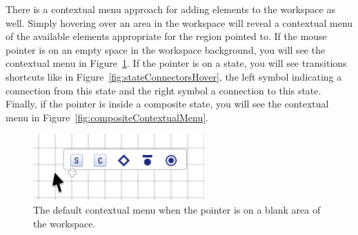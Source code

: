 \documentclass[11pt]{amsart}
\begin{document}
There is a contextual menu approach for adding elements to the workspace as well. Simply hovering over an area in the workspace will reveal a contextual menu of the available elements appropriate for the region pointed to. If the mouse pointer is on an empty space in the workspace background, you will see the contextual menu in Figure~\ref{fig:defaultContextualMenu}. If the pointer is on a state, you will see transitions shortcuts like in Figure~\ref{fig:stateConnectorsHover}, the left symbol indicating a connection from this state and the right symbol a connection to this state. Finally, if the pointer is inside a composite state, you will see the contextual menu in Figure~\ref{fig:compositeContextualMenu}.


\begin{figure}

\begin{center}
\vspace{.2in}
\centerline {
\includegraphics[height=1in]{StatechartsImages/DefaultContextualMenu.png}
}
\caption{The default contextual menu when the pointer is on a blank area of the workspace.}
\label{fig:defaultContextualMenu}
\end{center}
\end{figure}
\end{document}
